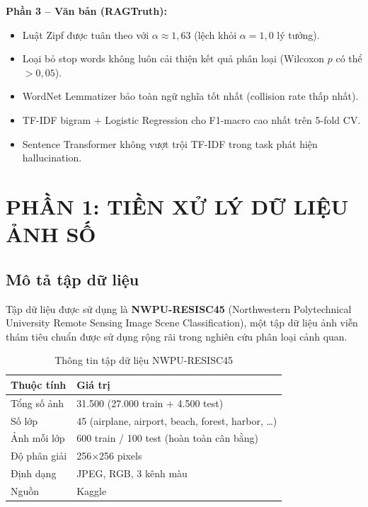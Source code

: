 \documentclass[12pt,a4paper]{article}
\let\oldtextbf\textbf
\renewcommand{\textbf}[1]{\oldtextbf{\textcolor{hcmublue}{#1}}}
\begin{document}
\textbf{Phần 3 -- Văn bản (RAGTruth):}
\begin{itemize}
    \item Luật Zipf được tuân theo với $\alpha \approx 1{,}63$ (lệch khỏi $\alpha = 1{,}0$ lý tưởng).
    \item Loại bỏ stop words không luôn cải thiện kết quả phân loại (Wilcoxon $p$ có thể $> 0{,}05$).
    \item WordNet Lemmatizer bảo toàn ngữ nghĩa tốt nhất (collision rate thấp nhất).
    \item TF-IDF bigram + Logistic Regression cho F1-macro cao nhất trên 5-fold CV.
    \item Sentence Transformer không vượt trội TF-IDF trong task phát hiện hallucination.
\end{itemize}

\section{PHẦN 1: TIỀN XỬ LÝ DỮ LIỆU ẢNH SỐ}

\subsection{Mô tả tập dữ liệu}

Tập dữ liệu được sử dụng là \textbf{NWPU-RESISC45} (Northwestern Polytechnical University Remote Sensing Image Scene Classification), một tập dữ liệu ảnh viễn thám tiêu chuẩn được sử dụng rộng rãi trong nghiên cứu phân loại cảnh quan.

\begin{table}[H]
\centering
\begin{tabular}{|l|l|}
\hline
\textbf{Thuộc tính} & \textbf{Giá trị} \\ \hline
Tổng số ảnh & 31.500 (27.000 train + 4.500 test) \\ \hline
Số lớp & 45 (airplane, airport, beach, forest, harbor, \ldots) \\ \hline
Ảnh mỗi lớp & 600 train / 100 test (hoàn toàn cân bằng) \\ \hline
Độ phân giải & 256$\times$256 pixels \\ \hline
Định dạng & JPEG, RGB, 3 kênh màu \\ \hline
Nguồn & Kaggle \\ \hline
\end{tabular}
\caption{Thông tin tập dữ liệu NWPU-RESISC45}
\label{tab:img_dataset}
\end{table}
\end{document}
